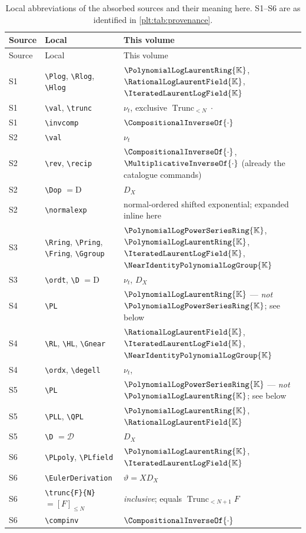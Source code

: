 \documentclass[11pt,oneside]{article}
\theoremstyle{plain}
\theoremstyle{definition}
\theoremstyle{remark}
\newcommand{\K}{\mathbb{K}}
\newcommand{\PLpow}{\PolynomialLogPowerSeriesRing{\K}}   %
\newcommand{\PLlau}{\PolynomialLogLaurentRing{\K}}       %
\newcommand{\PLrat}{\RationalLogLaurentField{\K}}        %
\newcommand{\PLit}{\IteratedLaurentLogField{\K}}         %
\newcommand{\Gnear}{\NearIdentityPolynomialLogGroup{\K}} %
\newcommand{\ordt}{\nu_{t}}                              %
\DeclareMathOperator{\degL}{deg_{L}}
\newcommand{\Trunc}[2]{\operatorname{Trunc}_{<#2}#1}     %
\newcommand{\DX}{D_{X}}                                  %
\newcommand{\EulerOp}{\vartheta}                         %
\newcommand{\rev}[1]{\CompositionalInverseOf{#1}}
\newcommand{\recip}[1]{\MultiplicativeInverseOf{#1}}
\begin{document}
\begin{longtable}{@{}l l l@{}}
\caption{Local abbreviations of the absorbed sources and their meaning here.
S1--S6 are as identified in \cref{plt:tab:provenance}.}
\label{plt:tab:concordance}\\
\toprule
Source & Local & This volume\\
\midrule
\endfirsthead
\toprule
Source & Local & This volume\\
\midrule
\endhead
S1 & \verb|\Plog|, \verb|\Rlog|, \verb|\Hlog| &
  \(\PLlau\), \(\PLrat\), \(\PLit\)\\
S1 & \verb|\val|, \verb|\trunc| & \(\ordt\), exclusive \(\Trunc{\cdot}{N}\)\\
S1 & \verb|\invcomp| & \(\rev{\cdot}\)\\
S2 & \verb|\val| & \(\ordt\)\\
S2 & \verb|\rev|, \verb|\recip| & \(\rev{\cdot}\), \(\recip{\cdot}\)
  (already the catalogue commands)\\
S2 & \verb|\Dop| \(=\mathrm{D}\) & \(\DX\)\\
S2 & \verb|\normalexp| & normal-ordered shifted exponential; expanded inline
  here\\
S3 & \verb|\Rring|, \verb|\Pring|, \verb|\Fring|, \verb|\Ggroup| &
  \(\PLpow\), \(\PLlau\), \(\PLit\), \(\Gnear\)\\
S3 & \verb|\ordt|, \verb|\D| \(=\mathrm{D}\) & \(\ordt\), \(\DX\)\\
S4 & \verb|\PL| & \(\PLlau\) --- \emph{not} \(\PLpow\); see below\\
S4 & \verb|\RL|, \verb|\HL|, \verb|\Gnear| & \(\PLrat\), \(\PLit\),
  \(\Gnear\)\\
S4 & \verb|\ordx|, \verb|\degell| & \(\ordt\), \(\degL\)\\
S5 & \verb|\PL| & \(\PLpow\) --- \emph{not} \(\PLlau\); see below\\
S5 & \verb|\PLL|, \verb|\QPL| & \(\PLlau\), \(\PLrat\)\\
S5 & \verb|\D| \(=\mathcal{D}\) & \(\DX\)\\
S6 & \verb|\PLpoly|, \verb|\PLfield| & \(\PLlau\), \(\PLit\)\\
S6 & \verb|\EulerDerivation| & \(\EulerOp=X\DX\)\\
S6 & \verb|\trunc{F}{N}| \(=[F]_{\le N}\) & \emph{inclusive}; equals
  \(\Trunc{F}{N+1}\)\\
S6 & \verb|\compinv| & \(\rev{\cdot}\)\\
\bottomrule
\end{longtable}
\end{document}
